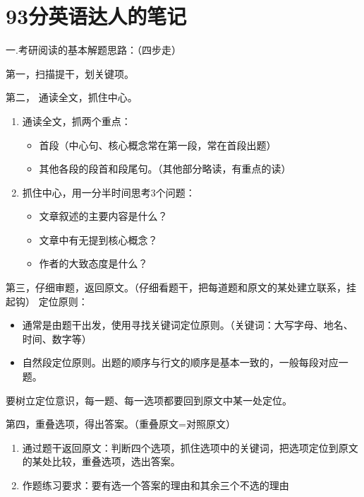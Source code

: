 \documentclass[11pt,twoside,openany,x11names,svgnames]{memoir}
\begin{document}
\section{93分英语达人的笔记}
\renewcommand{\indent}{1em}
\noindent 一.考研阅读的基本解题思路：（四步走）

第一，扫描提干，划关键项。

第二， 通读全文，抓住中心。
\begin{enumerate}
  \item 通读全文，抓两个重点：
\begin{itemize}
  \item 首段（中心句、核心概念常在第一段，常在首段出题）
  \item 其他各段的段首和段尾句。（其他部分略读，有重点的读）
\end{itemize}
  \item 抓住中心，用一分半时间思考3个问题：
\begin{itemize}
  \item 文章叙述的主要内容是什么？
  \item 文章中有无提到核心概念？
  \item 作者的大致态度是什么？
\end{itemize}
\end{enumerate}

第三，仔细审题，返回原文。（仔细看题干，把每道题和原文的某处建立联系，挂起钩）
定位原则：
\begin{itemize}
  \item 通常是由题干出发，使用寻找关键词定位原则。（关键词：大写字母、地名、时间、数字等）
  \item 自然段定位原则。出题的顺序与行文的顺序是基本一致的，一般每段对应一题。
\end{itemize}
要树立定位意识，每一题、每一选项都要回到原文中某一处定位。

第四，重叠选项，得出答案。（重叠原文=对照原文）
\begin{enumerate}
  \item 通过题干返回原文：判断四个选项，抓住选项中的关键词，把选项定位到原文的某处比较，重叠选项，选出答案。
  \item 作题练习要求：要有选一个答案的理由和其余三个不选的理由
\end{enumerate}
\end{document}
